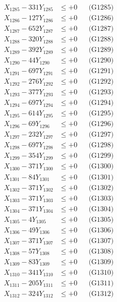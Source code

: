\documentclass[a4paper,10pt]{article}
\begin{document}
{\begin{align}
X_{1285} - 331Y_{1285} &\leq +0 && \text{(G1285)} \\
X_{1286} - 127Y_{1286} &\leq +0 && \text{(G1286)} \\
X_{1287} - 652Y_{1287} &\leq +0 && \text{(G1287)} \\
X_{1288} - 320Y_{1288} &\leq +0 && \text{(G1288)} \\
X_{1289} - 392Y_{1289} &\leq +0 && \text{(G1289)} \\
X_{1290} - 44Y_{1290} &\leq +0 && \text{(G1290)} \\
\allowbreak
X_{1291} - 697Y_{1291} &\leq +0 && \text{(G1291)} \\
X_{1292} - 276Y_{1292} &\leq +0 && \text{(G1292)} \\
X_{1293} - 377Y_{1293} &\leq +0 && \text{(G1293)} \\
X_{1294} - 697Y_{1294} &\leq +0 && \text{(G1294)} \\
X_{1295} - 614Y_{1295} &\leq +0 && \text{(G1295)} \\
X_{1296} - 69Y_{1296} &\leq +0 && \text{(G1296)} \\
X_{1297} - 232Y_{1297} &\leq +0 && \text{(G1297)} \\
X_{1298} - 697Y_{1298} &\leq +0 && \text{(G1298)} \\
X_{1299} - 354Y_{1299} &\leq +0 && \text{(G1299)} \\
X_{1300} - 371Y_{1300} &\leq +0 && \text{(G1300)} \\
\allowbreak
X_{1301} - 84Y_{1301} &\leq +0 && \text{(G1301)} \\
X_{1302} - 371Y_{1302} &\leq +0 && \text{(G1302)} \\
X_{1303} - 371Y_{1303} &\leq +0 && \text{(G1303)} \\
X_{1304} - 371Y_{1304} &\leq +0 && \text{(G1304)} \\
X_{1305} - 4Y_{1305} &\leq +0 && \text{(G1305)} \\
X_{1306} - 49Y_{1306} &\leq +0 && \text{(G1306)} \\
X_{1307} - 371Y_{1307} &\leq +0 && \text{(G1307)} \\
X_{1308} - 57Y_{1308} &\leq +0 && \text{(G1308)} \\
X_{1309} - 83Y_{1309} &\leq +0 && \text{(G1309)} \\
X_{1310} - 341Y_{1310} &\leq +0 && \text{(G1310)} \\
\allowbreak
X_{1311} - 205Y_{1311} &\leq +0 && \text{(G1311)} \\
X_{1312} - 324Y_{1312} &\leq +0 && \text{(G1312)} \\

\end{align}}
\end{document}

